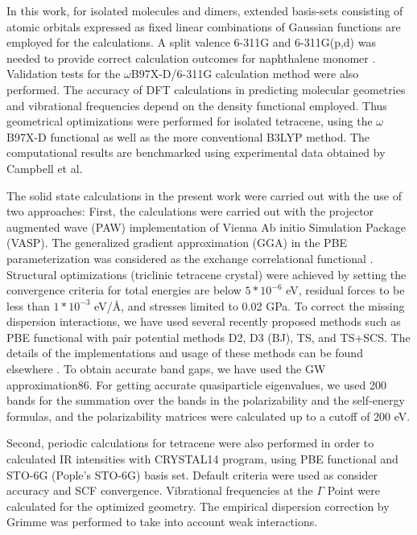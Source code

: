 In this work, for isolated molecules and dimers, extended basis-sets consisting of atomic orbitals expressed as fixed linear combinations of Gaussian functions are employed for the calculations.  A split valence 6-311G and 6-311G(p,d) \cite{krishnan1980self,frisch1984self} was needed to provide correct calculation outcomes for naphthalene monomer \cite{saeki2006theoretical}. Validation tests for the $\omega$B97X-D/6-311G calculation method were also performed. The accuracy of DFT calculations in predicting molecular geometries and vibrational frequencies depend on the density functional employed. Thus geometrical optimizations were performed for isolated tetracene, using the $\omega$B97X-D functional as well as the more conventional B3LYP method. The computational results are benchmarked using experimental data obtained by Campbell et al.\cite{campbell1962crystal}

The solid state calculations in the present work were carried out with the use of two approaches:
First, the calculations were carried out with the projector augmented wave (PAW) implementation of Vienna Ab initio Simulation Package (VASP)\cite{kresse1996efficient}. The generalized gradient approximation (GGA) in the PBE parameterization was considered as the exchange correlational functional \cite{perdew1996generalized}. Structural optimizations (triclinic tetracene crystal) were achieved by setting the convergence criteria for total energies are below $5*10^{-6}$ eV, residual forces to be less than $1*10^{-3}$ eV/Å, and stresses limited to 0.02 GPa. To correct the missing dispersion interactions, we have used several recently proposed methods such as PBE functional with pair potential methods D2, D3 (BJ), TS, and TS+SCS. The details of the implementations and usage of these methods can be found elsewhere \cite{grimme2006semiempirical,grimme2011effect,tkatchenko2009accurate,tkatchenko2012accurate,dion2004van}. To obtain accurate band gaps, we have used the GW approximation86.  For getting accurate quasiparticle eigenvalues, we used 200 bands for the summation over the bands in the polarizability and the self-energy formulas, and the polarizability matrices were calculated up to a cutoff  of 200 eV.

Second, periodic calculations for tetracene were also performed in order to calculated IR intensities with CRYSTAL14 program\cite{dovesi2014crystal14}, using PBE functional and STO-6G (Pople's STO-6G) basis set. Default criteria were used as consider accuracy and SCF convergence. Vibrational frequencies at the $\Gamma$ Point were calculated for the optimized geometry. The empirical dispersion correction by Grimme \cite{grimme2006semiempirical} was performed to take into account weak interactions. 

